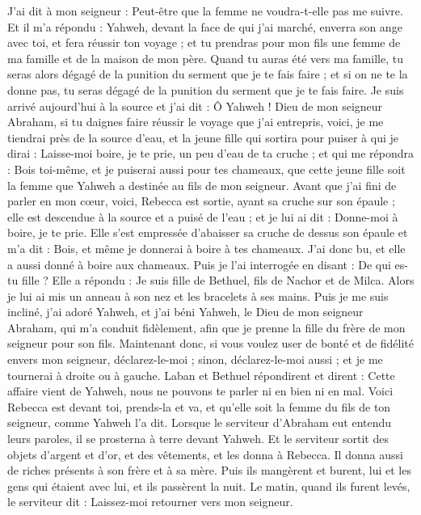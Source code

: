 \begin{multicols}{2}
J'ai dit à mon seigneur : Peut-être que la femme ne voudra-t-elle pas me suivre.
Et il m'a répondu : Yahweh, devant la face de qui j'ai marché, enverra son ange avec toi, et fera réussir ton voyage ; et tu prendras pour mon fils une femme de ma famille et de la maison de mon père.
Quand tu auras été vers ma famille, tu seras alors dégagé de la punition du serment que je te fais faire ; et si on ne te la donne pas, tu seras dégagé de la punition du serment que je te fais faire.
Je suis arrivé aujourd'hui à la source et j'ai dit : Ô Yahweh ! Dieu de mon seigneur Abraham, si tu daignes faire réussir le voyage que j'ai entrepris,
voici, je me tiendrai près de la source d'eau, et la jeune fille qui sortira pour puiser à qui je dirai : Laisse-moi boire, je te prie, un peu d'eau de ta cruche ; et qui me répondra :
Bois toi-même, et je puiserai aussi pour tes chameaux, que cette jeune fille soit la femme que Yahweh a destinée au fils de mon seigneur.
Avant que j'ai fini de parler en mon cœur, voici, Rebecca est sortie, ayant sa cruche sur son épaule ; elle est descendue à la source et a puisé de l'eau ; et je lui ai dit : Donne-moi à boire, je te prie.
Elle s'est empressée d'abaisser sa cruche de dessus son épaule et m'a dit : Bois, et même je donnerai à boire à tes chameaux. J'ai donc bu, et elle a aussi donné à boire aux chameaux.
Puis je l'ai interrogée en disant : De qui es-tu fille ? Elle a répondu : Je suis fille de Bethuel, fils de Nachor et de Milca. Alors je lui ai mis un anneau à son nez et les bracelets à ses mains.
Puis je me suis incliné, j'ai adoré Yahweh, et j'ai béni Yahweh, le Dieu de mon seigneur Abraham, qui m'a conduit fidèlement, afin que je prenne la fille du frère de mon seigneur pour son fils.
Maintenant donc, si vous voulez user de bonté et de fidélité envers mon seigneur, déclarez-le-moi ; sinon, déclarez-le-moi aussi ; et je me tournerai à droite ou à gauche.
Laban et Bethuel répondirent et dirent : Cette affaire vient de Yahweh, nous ne pouvons te parler ni en bien ni en mal.
Voici Rebecca est devant toi, prends-la et va, et qu'elle soit la femme du fils de ton seigneur, comme Yahweh l'a dit.
Lorsque le serviteur d'Abraham eut entendu leurs paroles, il se prosterna à terre devant Yahweh.
Et le serviteur sortit des objets d'argent et d'or, et des vêtements, et les donna à Rebecca. Il donna aussi de riches présents à son frère et à sa mère.
Puis ils mangèrent et burent, lui et les gens qui étaient avec lui, et ils passèrent la nuit. Le matin, quand ils furent levés, le serviteur dit : Laissez-moi retourner vers mon seigneur.

\end{multicols}
